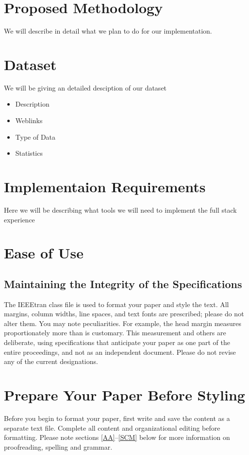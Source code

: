 \documentclass[conference]{IEEEtran}
\begin{document}
\section{Proposed Methodology}
We will describe in detail what we plan to do for our implementation. 

\section{Dataset}
We will be giving an detailed desciption of our dataset
\begin{itemize}
    \item Description
    \item Weblinks
    \item Type of Data
    \item Statistics
\end{itemize}

\section{Implementaion Requirements}
Here we will be describing what tools we will need to implement the full stack experience

\section{Ease of Use}

\subsection{Maintaining the Integrity of the Specifications}

The IEEEtran class file is used to format your paper and style the text. All margins, 
column widths, line spaces, and text fonts are prescribed; please do not 
alter them. You may note peculiarities. For example, the head margin
measures proportionately more than is customary. This measurement 
and others are deliberate, using specifications that anticipate your paper 
as one part of the entire proceedings, and not as an independent document. 
Please do not revise any of the current designations.

\section{Prepare Your Paper Before Styling}
Before you begin to format your paper, first write and save the content as a 
separate text file. Complete all content and organizational editing before 
formatting. Please note sections \ref{AA}--\ref{SCM} below for more information on 
proofreading, spelling and grammar.
\end{document}
